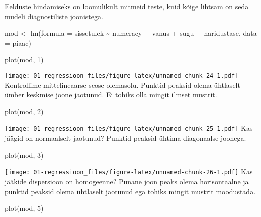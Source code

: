 \documentclass[
]{book}
\newenvironment{Shaded}{\begin{snugshade}}{\end{snugshade}}
\newcommand{\AttributeTok}[1]{\textcolor[rgb]{0.77,0.63,0.00}{#1}}
\newcommand{\DecValTok}[1]{\textcolor[rgb]{0.00,0.00,0.81}{#1}}
\newcommand{\FunctionTok}[1]{\textcolor[rgb]{0.00,0.00,0.00}{#1}}
\newcommand{\NormalTok}[1]{#1}
\newcommand{\OtherTok}[1]{\textcolor[rgb]{0.56,0.35,0.01}{#1}}
\newcommand{\SpecialCharTok}[1]{\textcolor[rgb]{0.00,0.00,0.00}{#1}}
\begin{document}
Eelduste hindamiseks on loomulikult mitmeid teste, kuid kõige lihtsam on seda mudeli diagnostiliste joonistega.

\begin{Shaded}
\begin{Highlighting}[]
\NormalTok{mod }\OtherTok{\textless{}{-}} \FunctionTok{lm}\NormalTok{(}\AttributeTok{formula =}\NormalTok{ sissetulek }\SpecialCharTok{\textasciitilde{}}\NormalTok{ numeracy }\SpecialCharTok{+}\NormalTok{ vanus }\SpecialCharTok{+}\NormalTok{ sugu }\SpecialCharTok{+}\NormalTok{ haridustase, }
    \AttributeTok{data =}\NormalTok{ piaac)}
\end{Highlighting}
\end{Shaded}

\begin{Shaded}
\begin{Highlighting}[]
\FunctionTok{plot}\NormalTok{(mod, }\DecValTok{1}\NormalTok{)}
\end{Highlighting}
\end{Shaded}

\texttt{[image: 01-regressioon\_files/figure-latex/unnamed-chunk-24-1.pdf]}
Kontrollime mittelineaarse seose olemasolu. Punktid peaksid olema ühtlaselt ümber keskmise joone jaotunud. Ei tohiks olla mingit ilmset mustrit.

\begin{Shaded}
\begin{Highlighting}[]
\FunctionTok{plot}\NormalTok{(mod, }\DecValTok{2}\NormalTok{)}
\end{Highlighting}
\end{Shaded}

\texttt{[image: 01-regressioon\_files/figure-latex/unnamed-chunk-25-1.pdf]}
Kas jäägid on normaalselt jaotunud? Punktid peaksid ühtima diagonaalse joonega.

\begin{Shaded}
\begin{Highlighting}[]
\FunctionTok{plot}\NormalTok{(mod, }\DecValTok{3}\NormalTok{)}
\end{Highlighting}
\end{Shaded}

\texttt{[image: 01-regressioon\_files/figure-latex/unnamed-chunk-26-1.pdf]}
Kas jääkide dispersioon on homogeenne? Punane joon peaks olema horisontaalne ja punktid peaksid olema ühtlaselt jaotunud ega tohiks mingit mustrit moodustada.

\begin{Shaded}
\begin{Highlighting}[]
\FunctionTok{plot}\NormalTok{(mod, }\DecValTok{5}\NormalTok{)}
\end{Highlighting}
\end{Shaded}
\end{document}
